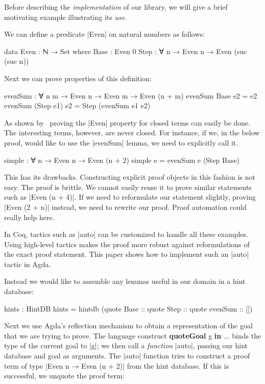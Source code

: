 \documentclass[preprint]{sigplanconf}
\begin{document}
Before describing the \emph{implementation} of our library, we will
give a brief motivating example illustrating its \emph{use}.

We can define a predicate |Even| on natural numbers as follows:

\begin{code}
  data Even : ℕ → Set where
    Base : Even 0
    Step : ∀ {n} → Even n → Even (suc (suc n))
\end{code}

Next we can prove properties of this definition:

\begin{code}
  evenSum : ∀ {n m} → Even n → Even m → Even (n + m)
  evenSum Base       e2  = e2
  evenSum (Step e1)  e2  = Step (evenSum e1 e2)
\end{code}

As shown by~\citet{van-der-walt} proving the |Even| property for closed
terms can easily be done. The interesting terms, however, are never closed.
For instance, if we, in the below proof, would like to use the |evenSum|
lemma, we need to explicitly call it.

\begin{code}
  simple : ∀ {n} → Even n → Even (n + 2)
  simple e = evenSum e (Step Base)
\end{code}

This has its drawbacks. Constructing explicit proof objects in this
fashion is not easy. The proof is brittle. We cannot easily reuse it
to prove similar statements such as |Even (n + 4)|. If we need to
reformulate our statement slightly, proving |Even (2 + n)| instead, we
need to rewrite our proof. Proof automation could really help here.

In Coq, tactics such as |auto| can be customized to handle all these
examples. Using high-level tactics makes the proof more robust against
reformulations of the exact proof statement. This paper shows how to
implement such an |auto| tactic in Agda.

Instead we would like to assemble any lemmas useful in our domain in a
hint database:

\begin{code}
  hints : HintDB
  hints = hintdb (quote Base
                  :: quote Step
                  :: quote evenSum
                  :: [])
\end{code}

Next we use Agda's reflection mechanism to obtain a representation of
the goal that we are trying to prove. The language construct \textbf{quoteGoal}
g \textbf{in} ... binds the type of the current goal to |g|; we then call a
\emph{function} |auto|, passing our hint database and goal as arguments.
The |auto| function tries to construct a proof term of type |Even n → Even
(n + 2)| from the hint database. If this is successful, we unquote the
proof term:
\end{document}
